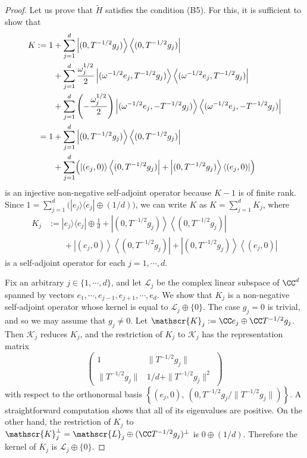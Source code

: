 \documentclass[12pt,draft]{article}
\theoremstyle{plain}
\numberwithin{equation}{section}
\theoremstyle{remark}
\begin{document}
\begin{proof}
Let us prove that $\tilde{H}$ satisfies the condition (B5).
For this, it is sufficient to show that
\begin{align*}
K:=1&+\sum_{j=1}^d\left|(0,T^{-1/2}g_j)\right\rangle\left\langle (0,T^{-1/2}g_j)\right|\\
&+ \sum_{j=1}^d\frac{\omega_j^{1/2}}{2} 
\left|(\omega^{-1/2}e_j,T^{-1/2}g_j)\right\rangle\left\langle (\omega^{-1/2}e_j,T^{-1/2}g_j)\right|\\
&+ \sum_{j=1}^d\left(-\frac{\omega_j^{1/2}}{2}\right) 
\left|(\omega^{-1/2}e_j,-T^{-1/2}g_j)\right\rangle\left\langle (\omega^{-1/2}e_j,-T^{-1/2}g_j)\right|\\
=1&+ \sum_{j=1}^d\left|(0,T^{-1/2}g_j)\right\rangle\left\langle (0,T^{-1/2}g_j)\right|\\
&+\sum_{j=1}^d
\Bigl(\left|(e_j,0)\right\rangle\left\langle (0,T^{-1/2}g_j)\right|
+\left|(0,T^{-1/2}g_j)\right\rangle\left\langle (e_j,0)\right|\Bigr)
\end{align*}
is an injective non-negative self-adjoint operator because $K-1$ is of finite rank.
Since $1=\sum_{j=1}^d\big(|e_j\rangle\langle e_j|\oplus (1/d)\big)$, 
we can write $K$ as $K=\sum_{j=1}^{d}K_j$, where
\begin{align*}
K_j&:=|e_j\rangle\langle e_j|\oplus \frac{1}{d}+\left|(0,T^{-1/2}g_j)\right\rangle\left\langle(0,T^{-1/2}g_j)\right|\\
&\phantom{:=}\ +\left|(e_j,0)\right\rangle\left\langle (0,T^{-1/2}g_j)\right|
+\left|(0,T^{-1/2}g_j)\right\rangle\left\langle (e_j,0)\right|
\end{align*}
is a self-adjoint operator for each $j=1,\cdots,d$.

Fix an arbitrary $j\in\{1,\cdots,d\}$, and let $\mathscr{L}_j$ be the complex linear subspace of $\CC^d$ spanned by vectors $e_1,\cdots,e_{j-1},e_{j+1},\cdots,e_d$.
We show that $K_j$ is a non-negative self-adjoint operator whose kernel is equal to $\mathscr{L}_j\oplus\{0\}$.
The case $g_j=0$ is trivial, and so we may assume that $g_j\not=0$.
Let $\mathscr{K}_j:=\CC e_j\oplus\CC T^{-1/2}g_j$.
Then $\mathscr{K}_j$ reduces $K_j$, and the restriction of $K_j$ to $\mathscr{K}_j$ has the representation matrix
\[
\begin{pmatrix}
1 & \|T^{-1/2}g_j\| \\
\|T^{-1/2}g_j\| & 1/d+\|T^{-1/2}g_j\|^2
\end{pmatrix}
\]
with respect to the orthonormal basis $\left\{(e_j,0),\ (0,T^{-1/2}g_j/\|T^{-1/2}g_j\|)\right\}$.
A straightforward computation shows that all of its eigenvalues are positive.
On the other hand, the restriction of $K_j$ to $\mathscr{K}_j^{\perp}=\mathscr{L}_j\oplus(\CC T^{-1/2}g_j)^{\perp}$ is $0\oplus(1/d)$.
Therefore the kernel of $K_j$ is $\mathscr{L}_j\oplus\{0\}$.


\end{proof}
\end{document}
